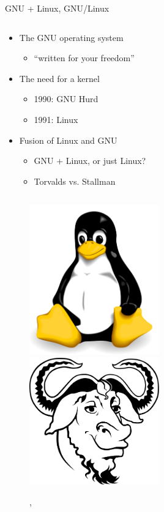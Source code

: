 

\begin{frame}{GNU + Linux, GNU/Linux}
  \begin{column}{0.5\textwidth}
    \begin{itemize}
      \item The GNU operating system
        \begin{itemize}
          \item ``written for your freedom''~\cite[para. 48]{rms2011}
        \end{itemize}
      \item The need for a kernel
        \begin{itemize}
          \item 1990: GNU Hurd
          \item 1991: Linux
        \end{itemize}
      \item Fusion of Linux and GNU
        \begin{itemize}
          \item GNU + Linux, or just Linux?
          \item Torvalds vs. Stallman
        \end{itemize}
    \end{itemize}
  \end{column}
  \begin{column}{0.5\textwidth}\raggedleft{}
    \begin{figure}
      \includegraphics[width = 0.50\textwidth]{images/tux.png}
      \includegraphics[width = 0.50\textwidth]{images/gnu.png}
      \caption{\Protect\cite{tux}, \Protect\cite{gnu}}
    \end{figure}
  \end{column}
\end{frame}

